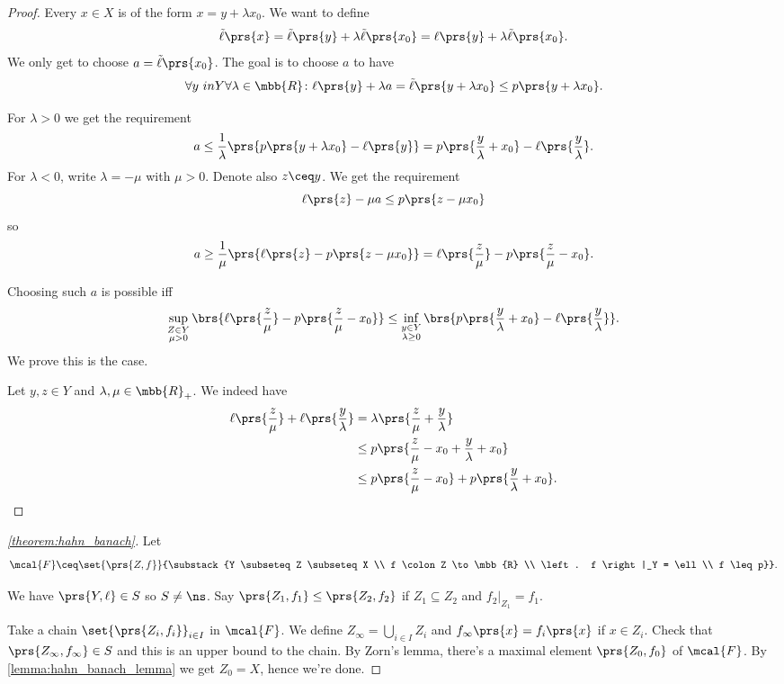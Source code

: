 \documentclass[10pt, twoside]{book}
\begin{document}
\begin{proof}
Every $x \in X$ is of the form $x = y + \lambda x_0$. We want to define
\[\tilde{\ell}\prs{x} = \tilde{\ell} \prs{y} + \lambda \tilde{\ell}\prs{x_0} = \ell\prs{y} + \lambda \tilde{\ell}\prs{x_0} \text{.}\]
We only get to choose $a = \tilde{\ell}\prs{x_0}$. The goal is to choose $a$ to have
\[\forall y\ in Y \forall \lambda \in \mbb{R} \colon \ell\prs{y} + \lambda a = \tilde{\ell} \prs{y + \lambda x_0} \leq p\prs{y + \lambda x_0} \text{.}\]

For $\lambda > 0$ we get the requirement
\[a \leq \frac{1}{\lambda} \prs{p \prs{y + \lambda x_0} - \ell\prs{y}} = p\prs{\frac{y}{\lambda} + x_0} - \ell\prs{\frac{y}{\lambda}} \text{.}\]
For $\lambda < 0$, write $\lambda = - \mu$ with $\mu > 0$. Denote also $z \ceq y$. We get the requirement
\[\ell\prs{z} - \mu a \leq p\prs{z - \mu x_0}\]
so
\[a \geq \frac{1}{\mu} \prs{\ell\prs{z} - p\prs{z-\mu x_0}} = \ell\prs{\frac{z}{\mu}} - p\prs{\frac{z}{\mu} - x_0} \text{.}\]

Choosing such $a$ is possible iff
\[\sup_{\substack{Z \in Y \\ \mu > 0}} \brs{\ell\prs{\frac{z}{\mu}} - p\prs{\frac{z}{\mu} - x_0}} \leq \inf_{\substack{y \in Y \\ \lambda \geq 0}} \brs{p\prs{\frac{y}{\lambda} + x_0} - \ell\prs{\frac{y}{\lambda}}} \text{.}\]
We prove this is the case.

Let $y,z \in Y$ and $\lambda,\mu \in \mbb{R}_+$.
We indeed have
\begin{align*}
\ell\prs{\frac{z}{\mu}} + \ell\prs{\frac{y}{\lambda}} &= \lambda\prs{\frac{z}{\mu} + \frac{y}{\lambda}}
\\&\leq
p\prs{\frac{z}{\mu} - x_0 + \frac{y}{\lambda} + x_0}
\\&\leq
p\prs{\frac{z}{\mu} - x_0} + p\prs{\frac{y}{\lambda} + x_0} \text{.}
\end{align*}
\end{proof}

\begin{proof}[\ref{theorem:hahn_banach}]
Let
\[\mcal{F} \ceq \set{\prs{Z, f}}{\substack{Y \subseteq Z \subseteq X \\ f \colon Z \to \mbb{R} \\ \left. f \right|_Y = \ell \\ f \leq p}} \text{.}\]

We have $\prs{Y, \ell} \in S$ so $S \neq \ns$.
Say $\prs{Z_1, f_1} \leq \prs{Z_2, f_2}$ if $Z_1 \subseteq Z_2$ and $\left. f_2 \right|_{Z_1} = f_1$.

Take a chain $\set{\prs{Z_i, f_i}}_{i \in I}$ in $\mcal{F}$. We define $Z_\infty = \bigcup_{i \in I} Z_i$ and $f_\infty\prs{x} = f_i\prs{x}$ if $x \in Z_i$. Check that $\prs{Z_\infty, f_\infty} \in S$ and this is an upper bound to the chain.
By Zorn's lemma, there's a maximal element $\prs{Z_0, f_0}$ of $\mcal{F}$.
By \ref{lemma:hahn_banach_lemma} we get $Z_0 = X$, hence we're done.
\end{proof}
\end{document}
